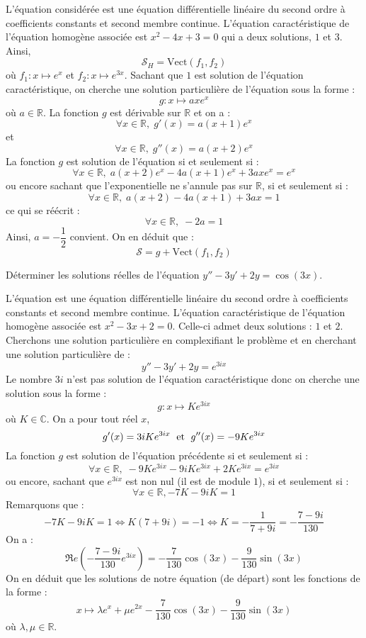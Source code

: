 \documentclass[a4paper,10pt]{report}
\begin{document}
\corr L'équation considérée est une équation différentielle linéaire du second ordre à coefficients constants et second membre continue. L'équation caractéristique de l'équation homogène associée est $x^2-4x+3=0$ qui a deux solutions, $1$ et $3$. Ainsi,
$$ \mathcal{S}_H = \textrm{Vect}(f_1,f_2)$$
où $f_1 : x \mapsto e^x$ et $f_2 : x \mapsto e^{3x}$. Sachant que $1$ est solution de l'équation caractéristique, on cherche une solution particulière de l'équation sous la forme :
$$ g : x \mapsto a x e^x$$
où $a \in \mathbb{R}$. La fonction $g$ est dérivable sur $\mathbb{R}$ et on a :
$$ \forall x \in \mathbb{R}, \; g'(x) = a (x+1)e^x$$
et
$$ \forall x \in \mathbb{R}, \; g''(x) = a (x+2)e^x$$
La fonction $g$ est solution de l'équation si et seulement si :
$$ \forall x \in \mathbb{R}, \;  a (x+2)e^x - 4a (x+1)e^x + 3axe^x = e^x$$
ou encore sachant que l'exponentielle ne s'annule pas sur $\mathbb{R}$, si et seulement si :
$$ \forall x \in \mathbb{R}, \; a (x+2) - 4a (x+1) + 3ax = 1$$
ce qui se réécrit :
$$  \forall x \in \mathbb{R}, \; -2a=1$$
Ainsi, $a= -\dfrac{1}{2}$ convient. On en déduit que :
$$ \mathcal{S} = g +  \textrm{Vect}(f_1,f_2)$$

\begin{Exercice}{} Déterminer les solutions réelles de l'équation $y'' - 3y' + 2y = \cos(3x)$.
\end{Exercice}

\corr L'équation est une équation différentielle linéaire du second ordre à coefficients constants et second membre continue. L'équation caractéristique de l'équation homogène associée est $x^2-3x+2=0$. Celle-ci admet deux solutions : $1$ et $2$. Cherchons une solution particulière en \og complexifiant \fg le problème et en cherchant une solution particulière de :
$$  y'' - 3y' + 2y = e^{3ix}$$
Le nombre $3i$ n'est pas solution de l'équation caractéristique donc on cherche une solution sous la forme :
$$ g : x \mapsto K e^{3ix}$$
où $K \in \mathbb{C}$. On a pour tout réel $x$,
$$ g'(x) = 3iK e^{3ix} \; \hbox{ et } \; g''(x) = -9K e^{3ix}$$
La fonction $g$ est solution de l'équation précédente si et seulement si :
$$ \forall x \in \mathbb{R}, \;   -9K e^{3ix} - 9iK e^{3ix} + 2K e^{3ix} = e^{3ix}$$
ou encore, sachant que $e^{3ix}$ est non nul (il est de module $1$), si et seulement si :
$$  \forall x \in \mathbb{R},  -7K - 9iK =1$$
Remarquons que :
$$ -7K - 9iK =1 \Longleftrightarrow K(7+9i) = -1 \Longleftrightarrow K = -\dfrac{1}{7+9i} =     -  \dfrac{7-9i}{130}$$
On a :
$$ \Re e \left(-  \dfrac{7-9i}{130} e^{3ix} \right) = - \dfrac{7}{130} \cos(3x) - \dfrac{9}{130} \sin(3x)$$
On en déduit que les solutions de notre équation (de départ) sont les fonctions de la forme :
$$ x \mapsto \lambda e^{x} + \mu e^{2x} - \dfrac{7}{130} \cos(3x) - \dfrac{9}{130} \sin(3x)$$
où $\lambda, \mu \in \mathbb{R}$.
\end{document}

